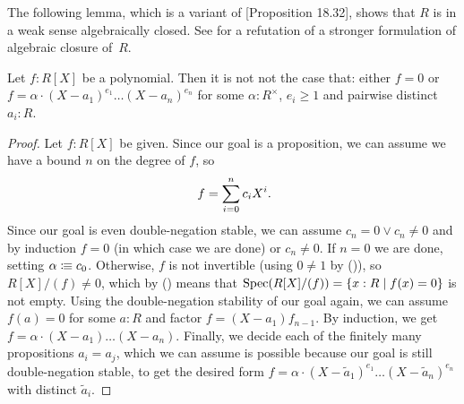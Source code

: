 The following lemma,
which is a variant of \cite{ingo-thesis}[Proposition 18.32],
shows that $R$ is in a weak sense algebraically closed.
See  for a refutation of
a stronger formulation of algebraic closure of~$R$.

\begin{lemma}%
  \label{polynomials-notnot-decompose}
  Let $f : R[X]$ be a polynomial.
  Then it is not not the case that:
  either $f = 0$ or
  $f = \alpha \cdot {(X - a_1)}^{e_1} \dots {(X - a_n)}^{e_n}$
  for some $\alpha : R^\times$,
  $e_i \geq 1$ and pairwise distinct $a_i : R$.
\end{lemma}

\begin{proof}
  Let $f : R[X]$ be given.
  Since our goal is a proposition,
  we can assume we have a bound $n$ on the degree of $f$,
  so
  \[ f = \sum_{i = 0}^n c_i X^i \rlap{.} \]
  Since our goal is even double-negation stable,
  we can assume $c_n = 0 \lor c_n \neq 0$
  and by induction $f = 0$ (in which case we are done)
  or $c_n \neq 0$.
  If $n = 0$ we are done,
  setting $\alpha \vcentcolon\mspace{-1.2mu}\equiv c_0$.
  Otherwise,
  $f$ is not invertible (using $0 \neq 1$ by ()),
  so $R[X]/(f) \neq 0$,
  which by () means that
  $\operatorname{Spec}(R[X]/(f)) = \{ x : R \mid f(x) = 0 \}$
  is not empty.
  Using the double-negation stability of our goal again,
  we can assume $f(a) = 0$ for some $a : R$
  and factor $f = (X - a_1) f_{n - 1}$.
  By induction, we get $f = \alpha \cdot (X - a_1) \dots (X - a_n)$.
  Finally, we decide each of the finitely many propositions $a_i = a_j$,
  which we can assume is possible
  because our goal is still double-negation stable,
  to get the desired form
  $f = \alpha \cdot {(X - \widetilde{a}_1)}^{e_1} \dots {(X - \widetilde{a}_n)}^{e_n}$
  with distinct $\widetilde{a}_i$.
\end{proof}
